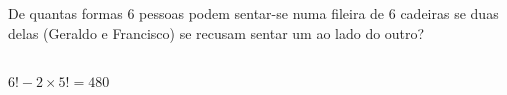 \begin{ex}
 De quantas formas 6 pessoas podem sentar-se numa fileira de 6 cadeiras se duas delas (Geraldo e Francisco) se recusam sentar um ao lado do outro?
 
 \begin{sol}
     \phantom{A} \\
    $6!-2 \times 5! = 480$
 \end{sol}
 
\end{ex}